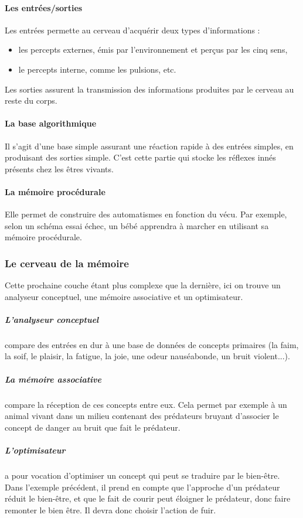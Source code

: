 \paragraph{Les entrées/sorties}
Les entrées permette au cerveau d'acquérir deux types d'informations :
\begin{itemize}
\item les percepts externes, émis par l'environnement et perçus par les cinq sens,
\item le percepts interne, comme les pulsions, etc. 
\end{itemize}

Les sorties assurent la transmission des informations produites par le cerveau au reste du corps.

\paragraph{La base algorithmique} Il s'agit d'une base simple assurant une réaction rapide à des entrées simples, en produisant des sorties simple. C'est cette partie qui stocke les réflexes innés présents chez les êtres vivants. 

\paragraph{La mémoire procédurale} Elle permet de construire des automatismes en fonction du vécu. Par exemple, selon un schéma essai échec, un bébé apprendra à marcher en utilisant sa mémoire procédurale.

\subsubsection{Le cerveau de la mémoire} Cette prochaine couche étant plus
complexe que la dernière, ici on trouve un analyseur conceptuel, une mémoire
associative et un optimisateur.
\subparagraph {L'analyseur conceptuel} compare des entrées en dur à une base de
données de concepts primaires (la faim, la soif, le plaisir, la fatigue, la joie, une odeur
nauséabonde, un bruit violent...).
\subparagraph {La mémoire associative} compare la réception de ces concepts
entre eux. Cela permet par exemple à un animal vivant dans un milieu contenant des prédateurs
bruyant d’associer le concept de danger au bruit que fait le prédateur.
\subparagraph {L’optimisateur} a pour vocation d’optimiser un concept qui peut
se traduire par le bien-être. Dans l’exemple précédent, il prend en compte que l’approche d’un
prédateur réduit le bien-être, et que le fait de courir peut éloigner le
prédateur, donc faire remonter le bien être. Il devra donc choisir l’action de
fuir.

